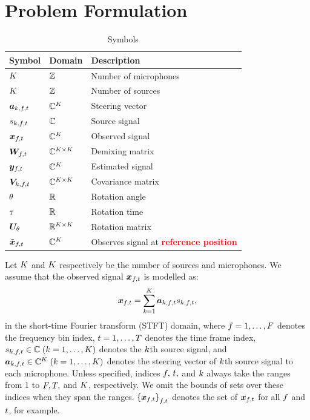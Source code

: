 \documentclass[sip,biber]{now-journal}
\begin{document}
\section{Problem Formulation}
\begin{table}[t]
  \centering
  \caption{Symbols}
  \begin{tabular}{lll}
    \toprule
      Symbol & Domain & Description \\
    \midrule
      $K$               & $\mathbb{Z}$                     & Number of microphones \\
      $K$               & $\mathbb{Z}$                     & Number of sources \\
      $\steer _{\src,\ft}$ & $\mathbb{C} ^{K}$             & Steering vector \\
      $\sig _{\src,\ft}$   & $\mathbb{C}$                     & Source signal \\
      $\Obs _{\ft}$        & $\mathbb{C}^{K}$              & Observed signal \\
      $\Demix _{\ft}$      & $\mathbb{C}^{K \times K}$  & Demixing matrix \\
      $\Est _{\ft}$        & $\mathbb{C}^{K}$              & Estimated signal \\
      $\cov _{\src,\ft}$   & $\mathbb{C}^{K \times K}$  & Covariance matrix \\
      $\theta$            & $\mathbb{R}$                     & Rotation angle \\
      $\tau$            & $\mathbb{R}$                     & Rotation time \\
      $\bm{U} _{\theta}$ & $\mathbb{R} ^{K \times K}$ & Rotation matrix \\
      $\irot{\Obs} _{\ft}$ & $\mathbb{C}^{K}$              & Observes signal at \textcolor{red}{\textbf{reference position}} \\
    \bottomrule
  \end{tabular}
\end{table}

Let $K$ and $K$ respectively be the number of sources and microphones.
We assume that the observed signal $\Obs _{\ft}$ is modelled as:
\begin{equation}
  \Obs _{\ft} = \sum _{\src=1} ^{\Src} \steer _{\src,\ft} \sig _{\src,\ft},
\end{equation}
in the short-time Fourier transform (STFT) domain,
where $f = 1, \dots, F$ denotes the frequency bin index,
$t = 1, \dots, T$ denotes the time frame index,
$\sig _{\src,\ft} \in \C\; (\src = 1, \dots, \Src)$ denotes the $k$th source signal, and
$\steer _{\src,\ft} \in \C ^{\Mic}\; (\src = 1, \dots, \Mic)$ denotes the steering vector of $k$th source signal to each microphone.
Unless specified, indices $f,\, t,$ and $k$ always take the ranges from 1 to $F, T,$ and $K$, respectively.
We omit the bounds of sets over these indices when they span the ranges.
${\{\Obs _{\ft}\}}_{\ft}$ denotes the set of $\Obs _{\ft}$ for all $f$ and $t$, for example.
\end{document}
